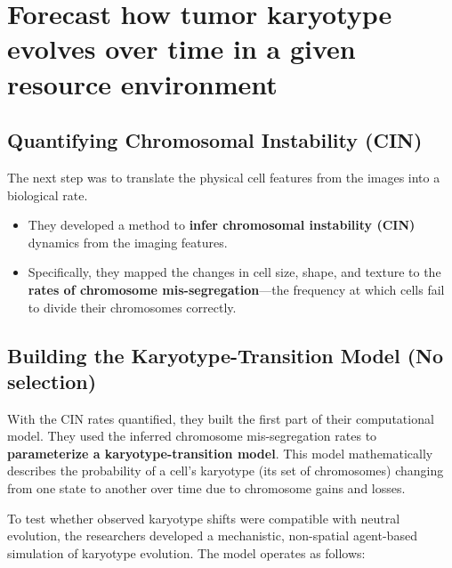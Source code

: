 \documentclass{article}
\begin{document}
\section{Forecast how tumor karyotype evolves over time in a given resource environment}

\subsection{Quantifying Chromosomal Instability (CIN)}
The next step was to translate the physical cell features from the images into a biological rate.
\begin{itemize}
    \item They developed a method to \textbf{infer chromosomal instability (CIN)} dynamics from the imaging features.
    \item Specifically, they mapped the changes in cell size, shape, and texture to the \textbf{rates of chromosome mis-segregation}—the frequency at which cells fail to divide their chromosomes correctly.
\end{itemize}

\subsection{Building the Karyotype-Transition Model (No selection)} \label{neutralModel}
With the CIN rates quantified, they built the first part of their computational model. They used the inferred chromosome mis-segregation rates to \textbf{parameterize a karyotype-transition model}. This model mathematically describes the probability of a cell's karyotype (its set of chromosomes) changing from one state to another over time due to chromosome gains and losses.

To test whether observed karyotype shifts were compatible with neutral evolution, the researchers developed a mechanistic, non-spatial agent-based simulation of karyotype evolution. The model operates as follows:
\end{document}
